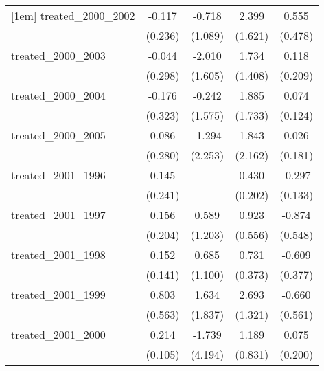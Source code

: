 {\begin{tabular}{l*{4}{c}}
[1em]
treated\_2000\_2002&      -0.117         &      -0.718         &       2.399         &       0.555         \\
            &     (0.236)         &     (1.089)         &     (1.621)         &     (0.478)         \\
[1em]
treated\_2000\_2003&      -0.044         &      -2.010         &       1.734         &       0.118         \\
            &     (0.298)         &     (1.605)         &     (1.408)         &     (0.209)         \\
[1em]
treated\_2000\_2004&      -0.176         &      -0.242         &       1.885         &       0.074         \\
            &     (0.323)         &     (1.575)         &     (1.733)         &     (0.124)         \\
[1em]
treated\_2000\_2005&       0.086         &      -1.294         &       1.843         &       0.026         \\
            &     (0.280)         &     (2.253)         &     (2.162)         &     (0.181)         \\
[1em]
treated\_2001\_1996&       0.145         &                     &       0.430\sym{*}  &      -0.297\sym{*}  \\
            &     (0.241)         &                     &     (0.202)         &     (0.133)         \\
[1em]
treated\_2001\_1997&       0.156         &       0.589         &       0.923         &      -0.874         \\
            &     (0.204)         &     (1.203)         &     (0.556)         &     (0.548)         \\
[1em]
treated\_2001\_1998&       0.152         &       0.685         &       0.731         &      -0.609         \\
            &     (0.141)         &     (1.100)         &     (0.373)         &     (0.377)         \\
[1em]
treated\_2001\_1999&       0.803         &       1.634         &       2.693\sym{*}  &      -0.660         \\
            &     (0.563)         &     (1.837)         &     (1.321)         &     (0.561)         \\
[1em]
treated\_2001\_2000&       0.214\sym{*}  &      -1.739         &       1.189         &       0.075         \\
            &     (0.105)         &     (4.194)         &     (0.831)         &     (0.200)         \\

\end{tabular}}
